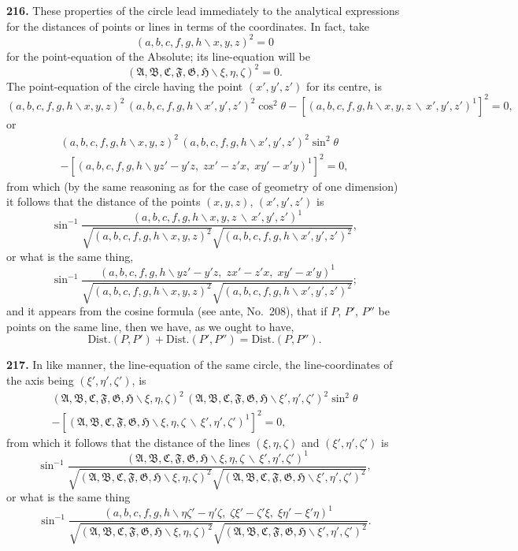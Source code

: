 \documentclass[11pt,a4paper]{article}
\begin{document}
\textbf{216.} These properties of the circle lead immediately to the analytical expressions
for the distances of points or lines in terms of the coordinates. In fact, take
\[
(a,b,c,f,g,h\!\backslash x,y,z)^2=0
\]
for the point-equation of the Absolute; its line-equation will be
\[
(\mathfrak{A},\mathfrak{B},\mathfrak{C},\mathfrak{F},\mathfrak{G},\mathfrak{H}\!\backslash \xi,\eta,\zeta)^2 = 0.
\]
The point-equation of the circle having the point $(x',y',z')$ for its centre, is
\[
(a,b,c,f,g,h\!\backslash x,y,z)^2\,(a,b,c,f,g,h\!\backslash x',y',z')^2\cos^2\theta
- [(a,b,c,f,g,h\!\backslash x,y,z\,\backslash\,x',y',z')^1]^2 = 0,
\]
or
\begin{multline*}
(a,b,c,f,g,h\!\backslash x,y,z)^2\,(a,b,c,f,g,h\!\backslash x',y',z')^2\sin^2\theta\\
- [(a,b,c,f,g,h\!\backslash yz'-y'z,\; zx'-z'x,\; xy'-x'y)^1]^2 = 0,
\end{multline*}
from which (by the same reasoning as for the case of geometry of one dimension) it
follows that the distance of the points $(x,y,z)$, $(x',y',z')$ is
\[
\sin^{-1}\frac{(a,b,c,f,g,h\!\backslash x,y,z\,\backslash\,x',y',z')^1}{\sqrt{(a,b,c,f,g,h\!\backslash x,y,z)^2}\sqrt{(a,b,c,f,g,h\!\backslash x',y',z')^2}},
\]
or what is the same thing,
\[
\sin^{-1}\frac{(a,b,c,f,g,h\!\backslash yz'-y'z,\; zx'-z'x,\; xy'-x'y)^1}{\sqrt{(a,b,c,f,g,h\!\backslash x,y,z)^2}\sqrt{(a,b,c,f,g,h\!\backslash x',y',z')^2}};
\]
and it appears from the cosine formula (see ante, No.~208), that if $P$, $P'$, $P''$ be
points on the same line, then we have, as we ought to have,
\[
\text{Dist.}(P,P') + \text{Dist.}(P',P'') = \text{Dist.}(P,P'').
\]

\textbf{217.} In like manner, the line-equation of the same circle, the line-coordinates of
the axis being $(\xi',\eta',\zeta')$, is
\begin{multline*}
(\mathfrak{A},\mathfrak{B},\mathfrak{C},\mathfrak{F},\mathfrak{G},\mathfrak{H}\!\backslash \xi,\eta,\zeta)^2\,(\mathfrak{A},\mathfrak{B},\mathfrak{C},\mathfrak{F},\mathfrak{G},\mathfrak{H}\!\backslash \xi',\eta',\zeta')^2\sin^2\theta\\
- [(\mathfrak{A},\mathfrak{B},\mathfrak{C},\mathfrak{F},\mathfrak{G},\mathfrak{H}\!\backslash \xi,\eta,\zeta\,\backslash\,\xi',\eta',\zeta')^1]^2 = 0,
\end{multline*}
from which it follows that the distance of the lines $(\xi,\eta,\zeta)$ and $(\xi',\eta',\zeta')$ is
\[
\sin^{-1}\frac{(\mathfrak{A},\mathfrak{B},\mathfrak{C},\mathfrak{F},\mathfrak{G},\mathfrak{H}\!\backslash \xi,\eta,\zeta\,\backslash\,\xi',\eta',\zeta')^1}{\sqrt{(\mathfrak{A},\mathfrak{B},\mathfrak{C},\mathfrak{F},\mathfrak{G},\mathfrak{H}\!\backslash \xi,\eta,\zeta)^2}\sqrt{(\mathfrak{A},\mathfrak{B},\mathfrak{C},\mathfrak{F},\mathfrak{G},\mathfrak{H}\!\backslash \xi',\eta',\zeta')^2}},
\]
or what is the same thing
\[
\sin^{-1}\frac{(a,b,c,f,g,h\!\backslash \eta\zeta'-\eta'\zeta,\; \zeta\xi'-\zeta'\xi,\; \xi\eta'-\xi'\eta)^1}{\sqrt{(\mathfrak{A},\mathfrak{B},\mathfrak{C},\mathfrak{F},\mathfrak{G},\mathfrak{H}\!\backslash \xi,\eta,\zeta)^2}\sqrt{(\mathfrak{A},\mathfrak{B},\mathfrak{C},\mathfrak{F},\mathfrak{G},\mathfrak{H}\!\backslash \xi',\eta',\zeta')^2}}.
\]
\end{document}
